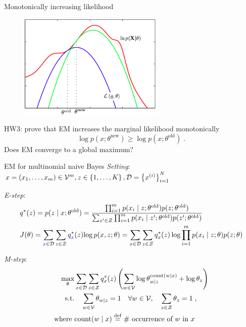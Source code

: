 \documentclass[usenames,dvipsnames,notes,11pt,aspectratio=169]{beamer}
\begin{document}
\begin{frame}
    {Monotonically increasing likelihood}
    \begin{figure}
        \includegraphics[height=5cm]{figures/EM-twosteps-Bishop9.14.png}
    \end{figure}
    \vspace{-2em}
    HW3: prove that EM increases the marginal likelihood monotonically
    $$
    \log p(x;\theta^{\text{new}}) \ge \log p(x;\theta^{\text{old}})
    \;.
    $$
    Does EM converge to a global maximum?
\end{frame}

\begin{frame}
    {EM for multinomial naive Bayes}
    \emph{Setting}: $x = (x_1,\ldots,x_m) \in \mathcal{V}^m, z\in\left\{ 1,\ldots,K \right\}, \mathcal{D}=\left\{ x^{(i)} \right\}_{i=1}^N$

    \emph{E-step}:
    \vspace{-1em}
    \begin{align*}
        &q^*(z) = p(z\mid x; \theta^{\text{old}}) = 
        \frac{\prod_{i=1}^m p(x_i\mid z; \theta^{\text{old}})p(z;\theta^{\text{old}})}
        {\sum_{z'\in\mathcal{Z}} \prod_{i=1}^m p(x_i\mid z'; \theta^{\text{old}})p(z';\theta^{\text{old}})}\\
        &J(\theta) = \sum_{{\color{blue}x}\in\mathcal{D}} \sum_{z\in\mathcal{Z}} q^*_{\color{blue}x}(z) {\log p(x,z;\theta)} 
        = \sum_{x\in\mathcal{D}} \sum_{z\in\mathcal{Z}} q^*_x(z) \log
        {\prod_{i=1}^m p(x_i\mid z;\theta) p(z;\theta)} 
    \end{align*}

    \emph{M-step}:
    \vspace{-1em}
    \begin{align*}
        \max_\theta& \sum_{x\in\mathcal{D}} \sum_{z\in\mathcal{Z}}q^*_x(z)\left(  \sum_{w\in\mathcal{V}}
        \log \theta_{w\mid z}^{\text{count}(w\mid x)} + \log \theta_z  \right)\\
        \text{s.t.} & \quad \sum_{w\in\mathcal{V}} \theta_{w\mid z} = 1 \quad \forall w\in\mathcal{V},
        \quad \sum_{z\in\mathcal{Z}}\theta_z = 1 \;,\\
        \text{where } & \text{count}(w\mid x) \stackrel{\rm def}{=} \text{\# occurrence of $w$ in $x$}
    \end{align*}
\end{frame}
\end{document}
